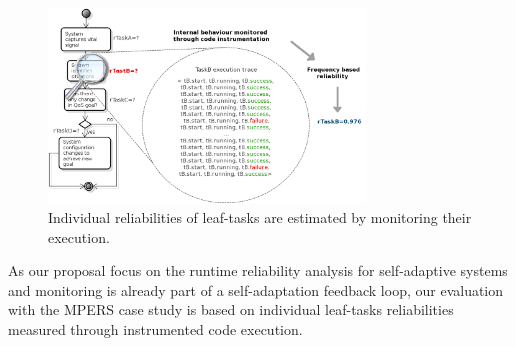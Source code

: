 \begin{figure}[ht!]
\centering
\includegraphics[width=0.75\textwidth]{imgs/MON_PMC.png}
\caption{Individual reliabilities of leaf-tasks are estimated by monitoring their execution.}
\label{fig:MON_PMC}
\end{figure}



As our proposal focus on the runtime reliability analysis for self-adaptive systems and monitoring is already part of a self-adaptation feedback loop, our evaluation with the MPERS case study is based on individual leaf-tasks reliabilities measured through instrumented code execution.



